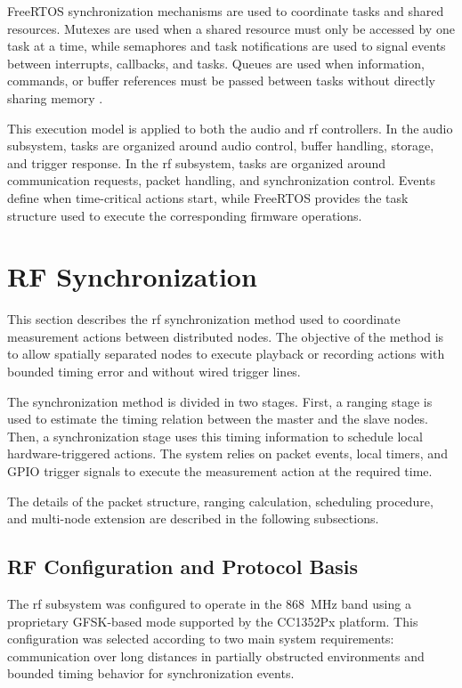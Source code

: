 FreeRTOS synchronization mechanisms are used to coordinate tasks and shared resources. Mutexes are used when a shared resource must only be accessed by one task at a time, while semaphores and task notifications are used to signal events between interrupts, callbacks, and tasks. Queues are used when information, commands, or buffer references must be passed between tasks without directly sharing memory \cite{FreeRTOSMutexes, FreeRTOSQueues, FreeRTOSTaskNotifications}.

This execution model is applied to both the audio and \acrshort{rf} controllers. In the audio subsystem, tasks are organized around audio control, buffer handling, storage, and trigger response. In the \acrshort{rf} subsystem, tasks are organized around communication requests, packet handling, and synchronization control. Events define when time-critical actions start, while FreeRTOS provides the task structure used to execute the corresponding firmware operations.


\section{RF Synchronization}
\label{sec:rf_synchronization}

This section describes the \acrshort{rf} synchronization method used to coordinate measurement actions between distributed nodes. The objective of the method is to allow spatially separated nodes to execute playback or recording actions with bounded timing error and without wired trigger lines.

The synchronization method is divided in two stages. First, a ranging stage is used to estimate the timing relation between the master and the slave nodes. Then, a synchronization stage uses this timing information to schedule local hardware-triggered actions. The system relies on packet events, local timers, and GPIO trigger signals to execute the measurement action at the required time.

The details of the packet structure, ranging calculation, scheduling procedure, and multi-node extension are described in the following subsections.

\subsection{RF Configuration and Protocol Basis}

The \acrshort{rf} subsystem was configured to operate in the 868~MHz band using a proprietary GFSK-based mode supported by the CC1352Px platform. This configuration was selected according to two main system requirements: communication over long distances in partially obstructed environments and bounded timing behavior for synchronization events.


